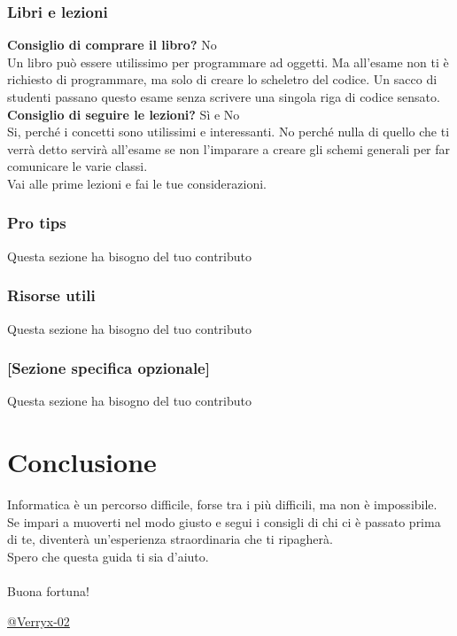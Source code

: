 \documentclass[18pt]{extarticle}
\begin{document}
\subsubsection{Libri e lezioni}
\textbf{Consiglio di comprare il libro?} No\\
Un libro può essere utilissimo per programmare ad oggetti. Ma all'esame non ti è richiesto di programmare, ma solo di creare lo scheletro del codice. Un sacco di studenti passano questo esame senza scrivere una singola riga di codice sensato.\\
\textbf{Consiglio di seguire le lezioni?} Sì e No\\
Si, perché i concetti sono utilissimi e interessanti. 
No perché nulla di quello che ti verrà detto servirà all'esame se non l'imparare a creare gli schemi generali per far comunicare le varie classi.\\ Vai alle prime lezioni e fai le tue considerazioni.

\subsubsection{Pro tips}
Questa sezione ha bisogno del tuo contributo

\subsubsection{Risorse utili}
Questa sezione ha bisogno del tuo contributo

\subsubsection{[Sezione specifica opzionale]}
Questa sezione ha bisogno del tuo contributo


\section{Conclusione}
Informatica è un percorso difficile, forse tra i più difficili, ma non è impossibile.\\
Se impari a muoverti nel modo giusto e segui i consigli di chi ci è passato prima di te, diventerà un'esperienza straordinaria che ti ripagherà.\\
Spero che questa guida ti sia d'aiuto.\\
\\
Buona fortuna!

\vspace{1cm}
\begin{flushright}
\href{https://github.com/Verryx-02}{@Verryx-02}
\end{flushright}
\end{document}
